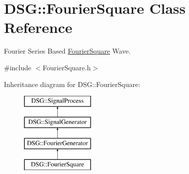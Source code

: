 \hypertarget{classDSG_1_1FourierSquare}{\section{D\+S\+G\+:\+:Fourier\+Square Class Reference}
\label{classDSG_1_1FourierSquare}
}


Fourier Series Based \hyperlink{classDSG_1_1FourierSquare}{Fourier\+Square} Wave.  




{\ttfamily \#include $<$Fourier\+Square.\+h$>$}

Inheritance diagram for D\+S\+G\+:\+:Fourier\+Square\+:\begin{figure}[H]
\begin{center}
\leavevmode
\includegraphics[height=4.000000cm]{classDSG_1_1FourierSquare}
\end{center}
\end{figure}
